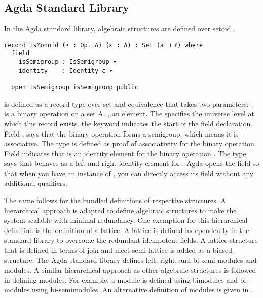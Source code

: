 \subsection{Agda Standard Library}
In the Agda standard library, algebraic structures are
defined over setoid \cite{danielsson2011agda}.

\begin{verbatim}
record IsMonoid (∙ : Op₂ A) (ε : A) : Set (a ⊔ ℓ) where
  field
    isSemigroup : IsSemigroup ∙
    identity    : Identity ε ∙

  open IsSemigroup isSemigroup public
\end{verbatim}

 is defined as a record type over set  and
equivalence  that takes two parameters: , is a binary
operation  on a set A. , an element. The  specifies the universe level at which this record exists. 
the keyword indicates the start of the field declaration. Field
, says that the binary operation  forms a
semigroup, which means it is associative. The  type is
defined as proof of associativity for the binary operation. Field
 indicates that  is an identity element for the
binary operation . The  type says that 
behaves as a left and right identity element for .  Agda  opens the
 field  so that when you have an
instance of , you can directly access its 
field without any additional qualifiers.

The same follows for the bundled definitions of respective structures. A
hierarchical approach is adapted to define algebraic structures to make the
system scalable with minimal redundancy. One exemption for this hierarchical
definition is the definition of a lattice. A lattice is defined independently in
the standard library to overcome the redundant idempotent fields. A lattice
structure that is defined in terms of join and meet semi-lattice is added as a
biased structure. The Agda standard library defines left, right, and bi
semi-modules and modules. A similar hierarchical approach as other algebraic
structures is followed in defining modules. For example, a module is defined
using bimodules and bi-modules using bi-semimodules. An alternative definition
of modules is given in .

